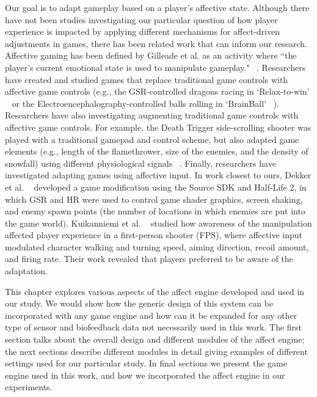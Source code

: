 
Our goal is to adapt gameplay based on a player's affective state. Although there have not been studies investigating our particular question of how player experience is impacted by applying different mechanisms for affect-driven adjustments in games, there has been related work that can inform our research. Affective gaming has been defined by Gilleade et al. as an activity where ``the player's current emotional state is used to manipulate gameplay." ~\cite{gilleade2005affective}. Researchers have created and studied games that replace traditional game controls with affective game controls (e.g., the GSR-controlled dragons racing in `Relax-to-win' ~\cite{bersak2001intelligent} or the Electroencephalography-controlled balls rolling in `BrainBall' ~\cite{hjelm2003research}). Researchers have also investigating augmenting traditional game controls with affective game controls. For example, the Death Trigger side-scrolling shooter was played with a traditional gamepad and control scheme, but also adapted game elements (e.g., length of the flamethrower, size of the enemies, and the density of snowfall) using different physiological signals ~\cite{nacke2011biofeedback}. Finally, researchers have investigated adapting games using affective input. In work closest to ours, Dekker et al. ~\cite{dekker2007please} developed a game modification using the Source SDK and Half-Life 2, in which GSR and HR were used to control game shader graphics, screen shaking, and enemy spawn points (the number of locations in which enemies are put into the game world).  Kuikanniemi et al. ~\cite{kuikkaniemi2010influence} studied how awareness of the manipulation affected player experience in a first-person shooter (FPS), where affective input modulated character walking and turning speed, aiming direction, recoil amount, and firing rate. Their work revealed that players preferred to be aware of the adaptation.

This chapter explores various aspects of the affect engine developed and used in our study. We would show how the generic design of this system can be incorporated with any game engine and how can it be expanded for any other type of sensor and biofeedback data not necessarily used in this work. The first section talks about the overall design and different modules of the affect engine; the next sections describe different modules in detail giving examples of different settings used for our particular study. In final sections we present the game engine used in this work, and how we incorporated the affect engine in our experiments.

